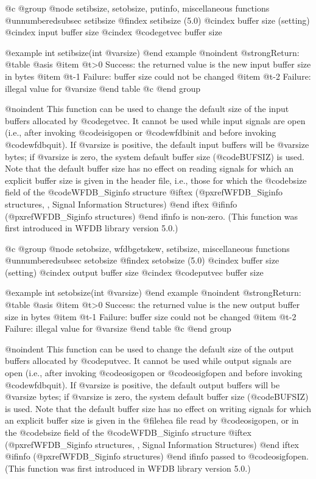 {{{{{{{{{{@c @group
@node     setibsize, setobsize, putinfo, miscellaneous functions
@unnumberedsubsec setibsize
@findex setibsize (5.0)
@cindex buffer size (setting)
@cindex input buffer size
@cindex @code{getvec} buffer size

@example
int setibsize(int @var{size})
@end example
@noindent
@strong{Return:}
@table @asis
@item @t{>0}
Success: the returned value is the new input buffer size in bytes
@item @t{-1}
Failure: buffer size could not be changed
@item @t{-2}
Failure: illegal value for @var{size}
@end table
@c @end group

@noindent
This function can be used to change the default size of the input
buffers allocated by @code{getvec}.  It cannot be used while input
signals are open (i.e., after invoking @code{isigopen} or @code{wfdbinit}
and before invoking @code{wfdbquit}).  If @var{size} is positive, the
default input buffers will be @var{size} bytes;  if @var{size} is zero,
the system default buffer size (@code{BUFSIZ}) is used.  Note that
the default buffer size has no effect on reading signals for which
an explicit buffer size is given in the header file, i.e.,
those for which the @code{bsize} field of the @code{WFDB_Siginfo} structure
@iftex
(@pxref{WFDB_Siginfo structures, , Signal Information Structures})
@end iftex
@ifinfo
(@pxref{WFDB_Siginfo structures})
@end ifinfo
is non-zero.
(This function was first introduced in WFDB library version 5.0.)

@c @group
@node     setobsize, wfdbgetskew, setibsize, miscellaneous functions
@unnumberedsubsec setobsize
@findex setobsize (5.0)
@cindex buffer size (setting)
@cindex output buffer size
@cindex @code{putvec} buffer size

@example
int setobsize(int @var{size})
@end example
@noindent
@strong{Return:}
@table @asis
@item @t{>0}
Success: the returned value is the new output buffer size in bytes
@item @t{-1}
Failure: buffer size could not be changed
@item @t{-2}
Failure: illegal value for @var{size}
@end table
@c @end group

@noindent
This function can be used to change the default size of the output
buffers allocated by @code{putvec}.  It cannot be used while output
signals are open (i.e., after invoking @code{osigopen} or
@code{osigfopen} and before invoking @code{wfdbquit}).  If @var{size} is
positive, the default output buffers will be @var{size} bytes; if
@var{size} is zero, the system default buffer size (@code{BUFSIZ}) is
used.  Note that the default buffer size has no effect on writing
signals for which an explicit buffer size is given in the @file{hea}
file read by @code{osigopen}, or in the @code{bsize} field of the
@code{WFDB_Siginfo} structure
@iftex
(@pxref{WFDB_Siginfo structures, , Signal Information Structures})
@end iftex
@ifinfo
(@pxref{WFDB_Siginfo structures})
@end ifinfo
passed to @code{osigfopen}.
(This function was first introduced in WFDB library version 5.0.)

}}}}}}}}}}
